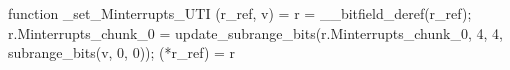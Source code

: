 function _set_Minterrupts_UTI (r_ref, v) = {
    r = __bitfield_deref(r_ref);
    r.Minterrupts_chunk_0 = update_subrange_bits(r.Minterrupts_chunk_0, 4, 4, subrange_bits(v, 0, 0));
    (*r_ref) = r
}
